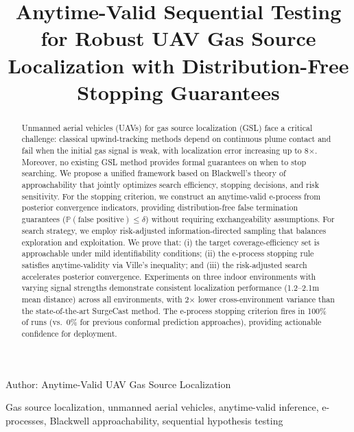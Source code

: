 \documentclass[journal]{IEEEtran}
\begin{document}
\title{Anytime-Valid Sequential Testing for Robust UAV Gas Source Localization with Distribution-Free Stopping Guarantees}

\author{
}

%
{Author: Anytime-Valid UAV Gas Source Localization}

\maketitle

\begin{abstract}
Unmanned aerial vehicles (UAVs) for gas source localization (GSL) face a critical challenge: classical upwind-tracking methods depend on continuous plume contact and fail when the initial gas signal is weak, with localization error increasing up to 8$\times$. Moreover, no existing GSL method provides formal guarantees on when to stop searching. We propose a unified framework based on Blackwell's theory of approachability that jointly optimizes search efficiency, stopping decisions, and risk sensitivity. For the stopping criterion, we construct an anytime-valid e-process from posterior convergence indicators, providing distribution-free false termination guarantees ($\mathbb{P}(\text{false positive}) \leq \delta$) without requiring exchangeability assumptions. For search strategy, we employ risk-adjusted information-directed sampling that balances exploration and exploitation. We prove that: (i) the target coverage-efficiency set is approachable under mild identifiability conditions; (ii) the e-process stopping rule satisfies anytime-validity via Ville's inequality; and (iii) the risk-adjusted search accelerates posterior convergence. Experiments on three indoor environments with varying signal strengths demonstrate consistent localization performance (1.2--2.1m mean distance) across all environments, with 2$\times$ lower cross-environment variance than the state-of-the-art SurgeCast method. The e-process stopping criterion fires in 100\% of runs (vs.\ 0\% for previous conformal prediction approaches), providing actionable confidence for deployment.
\end{abstract}

\begin{IEEEkeywords}
Gas source localization, unmanned aerial vehicles, anytime-valid inference, e-processes, Blackwell approachability, sequential hypothesis testing
\end{IEEEkeywords}






\end{document}
